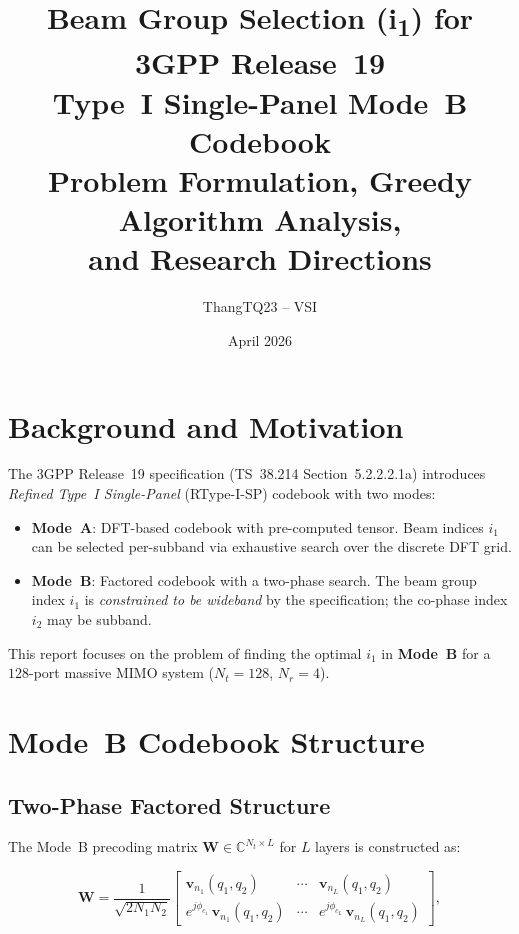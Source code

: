 \documentclass[12pt, a4paper]{article}
\title{%
    \textbf{Beam Group Selection (i\textsubscript{1}) for 3GPP Release~19\\
    Type~I Single-Panel Mode~B Codebook}\\[0.5em]
    \large Problem Formulation, Greedy Algorithm Analysis,\\
    and Research Directions
}
\author{ThangTQ23 -- VSI}
\date{April 2026}
\newcommand{\bW}{\mathbf{W}}
\newcommand{\bv}{\mathbf{v}}
\newcommand{\C}{\mathbb{C}}
\begin{document}
\maketitle
\tableofcontents
\newpage

\section{Background and Motivation}

The 3GPP Release~19 specification (TS~38.214 Section~5.2.2.2.1a) introduces
\emph{Refined Type~I Single-Panel} (RType-I-SP) codebook with two modes:

\begin{itemize}
    \item \textbf{Mode~A}: DFT-based codebook with pre-computed tensor.
          Beam indices $i_1$ can be selected per-subband via exhaustive search
          over the discrete DFT grid.
    \item \textbf{Mode~B}: Factored codebook with a two-phase search.
          The beam group index $i_1$ is \emph{constrained to be wideband}
          by the specification; the co-phase index $i_2$ may be subband.
\end{itemize}

This report focuses on the problem of finding the optimal $i_1$ in \textbf{Mode~B}
for a $128$-port massive MIMO system ($N_t = 128$, $N_r = 4$).

\section{Mode~B Codebook Structure}

\subsection{Two-Phase Factored Structure}

The Mode~B precoding matrix $\bW \in \C^{N_t \times L}$ for $L$ layers is
constructed as:

\begin{equation}
    \bW = \frac{1}{\sqrt{2 N_1 N_2}}
    \begin{bmatrix}
        \bv_{n_1}(q_1,q_2) & \cdots & \bv_{n_L}(q_1,q_2) \\[4pt]
        e^{j\phi_{c_1}}\,\bv_{n_1}(q_1,q_2) & \cdots & e^{j\phi_{c_L}}\,\bv_{n_L}(q_1,q_2)
    \end{bmatrix},
    \label{eq:W_modeB}
\end{equation}
\end{document}
